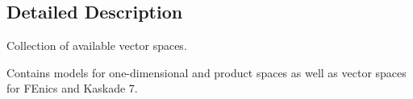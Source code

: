 \subsection{Detailed Description}
Collection of available vector spaces. 

Contains models for one-\/dimensional and product spaces as well as vector spaces for F\+Enics and Kaskade 7. 
